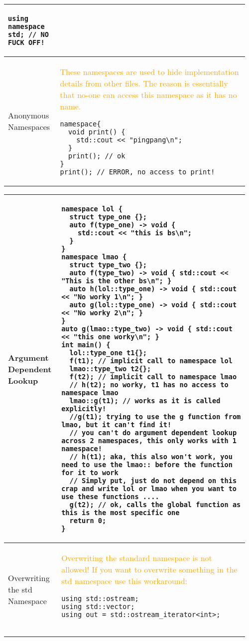 \documentclass[main.tex,fontsize=8pt,paper=a4,paper=portrait,DIV=calc]{scrartcl}
\begin{document}
\begin{table}[ht!]
\begin{tabular}{|m{0.2\linewidth}|m{0.755\linewidth}|}
\begin{lstlisting}
using namespace std; // NO FUCK OFF!
\end{lstlisting}\\
\hline
Anonymous Namespaces & 
\textcolor{orange}{These namespaces are used to hide implementation details from other files.\newline
The reason is essentially that no-one can access this namespace as it has no name.}\newline
\begin{lstlisting}
namespace{
  void print() {
    std::cout << "pingpang\n";
  }
  print(); // ok
}
print(); // ERROR, no access to print!
\end{lstlisting}\\
\hline
\end{tabular}
\end{table}
\pagebreak
\begin{table}[ht!]
\begin{tabular}{|m{0.2\linewidth}|m{0.755\linewidth}|}
\hline
Argument Dependent Lookup & 
\vspace{2mm}
\begin{lstlisting}
namespace lol {
  struct type_one {};
  auto f(type_one) -> void {
    std::cout << "this is bs\n";
  }
}
namespace lmao {
  struct type_two {};
  auto f(type_two) -> void { std::cout << "This is the other bs\n"; }
  auto h(lol::type_one) -> void { std::cout << "No worky 1\n"; }
  auto g(lol::type_one) -> void { std::cout << "No worky 2\n"; }
}
auto g(lmao::type_two) -> void { std::cout << "this one worky\n"; }
int main() {
  lol::type_one t1{};
  f(t1); // implicit call to namespace lol
  lmao::type_two t2{};
  f(t2); // implicit call to namespace lmao
  // h(t2); no worky, t1 has no access to namespace lmao
  lmao::g(t1); // works as it is called explicitly!
  //g(t1); trying to use the g function from lmao, but it can't find it!
  // you can't do argument dependent lookup across 2 namespaces, this only works with 1 namespace!
  // h(t1); aka, this also won't work, you need to use the lmao:: before the function for it to work
  // Simply put, just do not depend on this crap and write lol or lmao when you want to use these functions ....
  g(t2); // ok, calls the global function as this is the most specific one
  return 0;
}
\end{lstlisting}
\\
\hline
Overwriting the std Namespace & 
\textcolor{orange}{Overwriting the standard namespace is not allowed!\newline
If you want to overwrite something in the std namespace use this workaround:}\newline
\begin{lstlisting}
using std::ostream;
using std::vector;
using out = std::ostream_iterator<int>;


\end{lstlisting}
\end{tabular}
\end{table}
\end{document}
